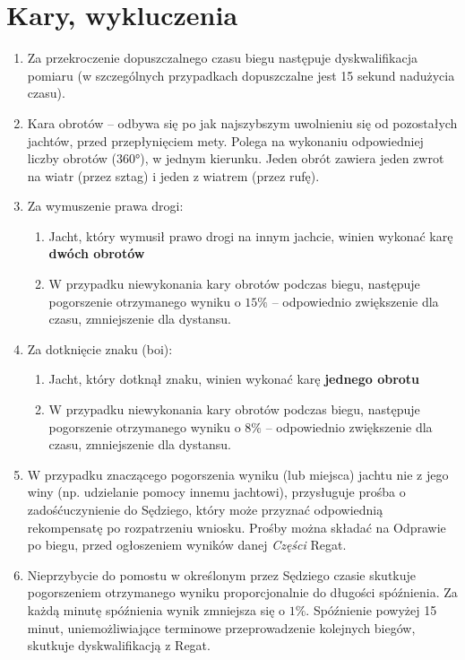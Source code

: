 \documentclass[12pt,a4paper]{article}
\begin{document}
\section{Kary, wykluczenia}
\begin{enumerate}
    \item Za przekroczenie dopuszczalnego czasu biegu następuje dyskwalifikacja pomiaru (w szczególnych przypadkach dopuszczalne jest 15 sekund nadużycia czasu).
    \item Kara obrotów -- odbywa się po jak najszybszym uwolnieniu się od pozostałych jachtów, przed przepłynięciem mety. Polega na wykonaniu odpowiedniej liczby obrotów (360°), w jednym kierunku. Jeden obrót zawiera jeden zwrot na wiatr (przez sztag) i jeden z wiatrem (przez rufę).
    \item Za wymuszenie prawa drogi:
    \begin{enumerate}
        \item Jacht, który wymusił prawo drogi na innym jachcie, winien wykonać karę \textbf{dwóch obrotów}
        \item W przypadku niewykonania kary obrotów podczas biegu, następuje pogorszenie otrzymanego wyniku o $15\%$ -- odpowiednio zwiększenie dla czasu, zmniejszenie dla dystansu.
    \end{enumerate}
    \item Za dotknięcie znaku (boi):
    \begin{enumerate}
        \item Jacht, który dotknął znaku, winien wykonać karę \textbf{jednego obrotu}
        \item W przypadku niewykonania kary obrotów podczas biegu, następuje pogorszenie otrzymanego wyniku o $8\%$ -- odpowiednio zwiększenie dla czasu, zmniejszenie dla dystansu.
    \end{enumerate}
    \item W przypadku znaczącego pogorszenia wyniku (lub miejsca) jachtu nie z jego winy (np. udzielanie pomocy innemu jachtowi), przysługuje prośba o zadośćuczynienie do Sędziego, który może przyznać odpowiednią rekompensatę po rozpatrzeniu wniosku.
    Prośby można składać na Odprawie po biegu, przed ogłoszeniem wyników danej \textit{Części} Regat.
    \item Nieprzybycie do pomostu w określonym przez Sędziego czasie skutkuje pogorszeniem otrzymanego wyniku proporcjonalnie do długości spóźnienia. Za każdą minutę spóźnienia wynik zmniejsza się o $1\%$.
    Spóźnienie powyżej 15 minut, uniemożliwiające terminowe przeprowadzenie kolejnych biegów, skutkuje dyskwalifikacją z Regat.
\end{enumerate}
\end{document}

